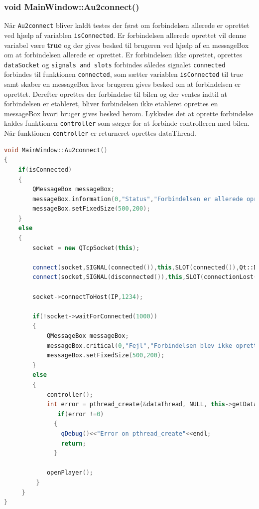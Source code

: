 \subsubsection{void MainWindow::Au2connect()}
Når \texttt{Au2connect} bliver kaldt testes der først om forbindelsen allerede er oprettet ved hjælp af variablen \texttt{isConnected}. Er forbindelsen allerede oprettet vil denne variabel være \textbf{true} og der gives besked til brugeren ved hjælp af en messageBox om at forbindelsen allerede er oprettet. Er forbindelsen ikke oprettet, oprettes \texttt{dataSocket} og \texttt{signals and slots} forbindes således signalet \texttt{connected} forbindes til funktionen \texttt{connected}, som sætter variablen \texttt{isConnected} til true samt skaber en messageBox hvor brugeren gives besked om at forbindelsen er oprettet. Derefter oprettes der forbindelse til bilen og der ventes indtil at forbindelsen er etableret, bliver forbindelsen ikke etableret oprettes en messageBox hvori bruger gives besked herom. Lykkedes det at oprette forbindelse kaldes funktionen \texttt{controller} som sørger for at forbinde controlleren med bilen. Når funktionen \texttt{controller} er returneret oprettes dataThread.
\begin{lstlisting}[caption={Au2Connect},label=lst:au2connect, language=c++]
void MainWindow::Au2connect()
{
    if(isConnected)
    {
        QMessageBox messageBox;
        messageBox.information(0,"Status","Forbindelsen er allerede oprettet!");
        messageBox.setFixedSize(500,200);
    }
    else
    {
        socket = new QTcpSocket(this);

        connect(socket,SIGNAL(connected()),this,SLOT(connected()),Qt::DirectConnection);
        connect(socket,SIGNAL(disconnected()),this,SLOT(connectionLost()),Qt::DirectConnection);

        socket->connectToHost(IP,1234);

        if(!socket->waitForConnected(1000))
        {
            QMessageBox messageBox;
            messageBox.critical(0,"Fejl","Forbindelsen blev ikke oprettet!");
            messageBox.setFixedSize(500,200);
        }
        else
        {
            controller();
            int error = pthread_create(&dataThread, NULL, this->getDataHelper ,this);
               if(error !=0)
              {
                qDebug()<<"Error on pthread_create"<<endl;
                return;
              }

            openPlayer();
         }
     }
}
\end{lstlisting}
